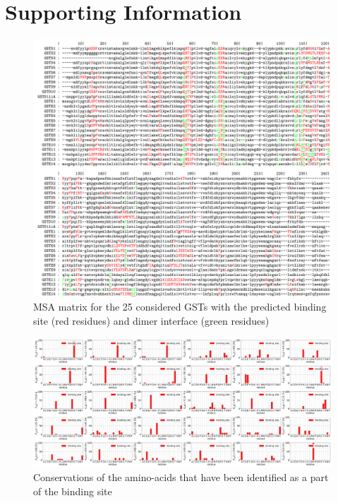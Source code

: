 \chapter*{Supporting Information}

\makeatletter
\renewcommand{\fnum@figure}{\figurename~S\thefigure}
\makeatother

\makeatletter
\renewcommand{\fnum@table}{\tablename~S\thetable}
\makeatother

\setcounter{figure}{0}

\begin{figure}[H]
	\label{MSA + AF + AFi}
	\center\includegraphics[width = .99\linewidth]{figures/MSA_matrix.pdf} %
	\caption{MSA matrix for the 25 considered GSTs with the predicted binding site (red residues) and dimer interface (green residues)}
\end{figure}
	
\begin{figure}
	\label{Conservation BSs}
	\includegraphics[width = .99\linewidth]{figures/Conservation_array_binding_site.jpg}
	\caption{Conservations of the amino-acids that have been identified as a part of the binding site}
\end{figure}

